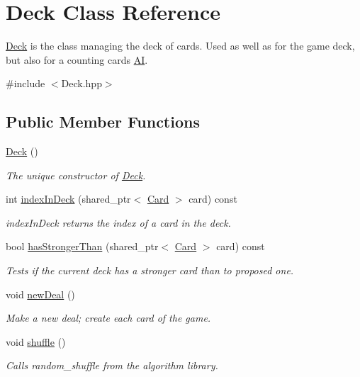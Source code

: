\hypertarget{classDeck}{\section{Deck Class Reference}
\label{classDeck}
}


\hyperlink{classDeck}{Deck} is the class managing the deck of cards. Used as well as for the game deck, but also for a counting cards \hyperlink{classAI}{A\-I}.  




{\ttfamily \#include $<$Deck.\-hpp$>$}

\subsection*{Public Member Functions}
\begin{DoxyCompactItemize}
\item 
\hypertarget{classDeck_a57ae1cb4ac6fd61c249cefb2db85eb99}{\hyperlink{classDeck_a57ae1cb4ac6fd61c249cefb2db85eb99}{Deck} ()}\label{classDeck_a57ae1cb4ac6fd61c249cefb2db85eb99}

\begin{DoxyCompactList}\small\item\em The unique constructor of \hyperlink{classDeck}{Deck}. \end{DoxyCompactList}\item 
int \hyperlink{classDeck_afe7b0b266ec9a30c271333d00a3b4168}{index\-In\-Deck} (shared\-\_\-ptr$<$ \hyperlink{classCard}{Card} $>$ card) const 
\begin{DoxyCompactList}\small\item\em index\-In\-Deck returns the index of a card in the deck. \end{DoxyCompactList}\item 
bool \hyperlink{classDeck_a82a3371b10b8be7bc5fef6999a56bb88}{has\-Stronger\-Than} (shared\-\_\-ptr$<$ \hyperlink{classCard}{Card} $>$ card) const 
\begin{DoxyCompactList}\small\item\em Tests if the current deck has a stronger card than to proposed one. \end{DoxyCompactList}\item 
\hypertarget{classDeck_aec4d8d2a67f1c46a1a7f175b8848f5b6}{void \hyperlink{classDeck_aec4d8d2a67f1c46a1a7f175b8848f5b6}{new\-Deal} ()}\label{classDeck_aec4d8d2a67f1c46a1a7f175b8848f5b6}

\begin{DoxyCompactList}\small\item\em Make a new deal; create each card of the game. \end{DoxyCompactList}\item 
\hypertarget{classDeck_ae5a1e52ab00ae5924f2bc6b730dba3eb}{void \hyperlink{classDeck_ae5a1e52ab00ae5924f2bc6b730dba3eb}{shuffle} ()}\label{classDeck_ae5a1e52ab00ae5924f2bc6b730dba3eb}

\begin{DoxyCompactList}\small\item\em Calls random\-\_\-shuffle from the algorithm library. \end{DoxyCompactList}\end{DoxyCompactItemize}
